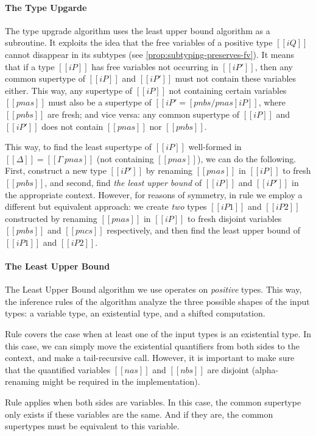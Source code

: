 \paragraph{The Type Upgarde}
The type upgrade algorithm uses the least upper bound algorithm as a subroutine.
It exploits the idea that the free variables of a positive type $[[iQ]]$
cannot disappear in its subtypes (see \cref{prop:subtyping-preserves-fv}). 
It means that if 
a type $[[iP]]$ has free variables not occurring 
in $[[iP']]$, then any common supertype of $[[iP]]$
and $[[iP']]$ must not contain these variables either.
This way, any supertype of $[[iP]]$
not containing certain variables $[[pnas]]$ must also be 
a supertype of $[[iP' = [pnbs/pnas]iP ]]$, where $[[pnbs]]$ are fresh;
and vice versa: any common supertype of $[[iP]]$ and $[[iP']]$
does not contain $[[pnas]]$ nor $[[pnbs]]$.

This way, to find the least supertype of $[[iP]]$ well-formed in $[[Δ]] = [[Γ \ {pnas}]]$
(\ie not containing $[[pnas]]$), we can do the following.
First, construct a new type $[[iP']]$ by renaming $[[pnas]]$ in $[[iP]]$ to fresh $[[pnbs]]$,
and second, find \emph{the least upper bound} of $[[iP]]$ and $[[iP']]$ in the appropriate
context. However, for reasons of symmetry, in rule
 we employ a different but equivalent approach:
we create \emph{two} types $[[iP1]]$ and $[[iP2]]$ constructed by renaming $[[pnas]]$ in $[[iP]]$
to fresh disjoint variables $[[pnbs]]$ and $[[pncs]]$ respectively, and then 
find the least upper bound of $[[iP1]]$ and $[[iP2]]$.

\paragraph{The Least Upper Bound}
The Least Upper Bound algorithm we use operates on \emph{positive}
types. This way, the inference rules of the algorithm
analyze the three possible shapes of the input types:
a variable type, an existential type, and a shifted computation.

 Rule  covers the case when 
 at least one of the input types is an existential type.
 In this case, we can simply move the existential quantifiers
 from both sides to the context, and make a tail-recursive call.
 However, it is important to make sure that 
 the quantified variables $[[nas]]$ and $[[nbs]]$ are disjoint
 (\ie alpha-renaming might be required in the implementation).
  
 Rule  applies when 
 both sides are variables. In this case,
 the common supertype only exists if these variables are 
 the same. And if they are, the common supertypes
 must be equivalent to this variable.

